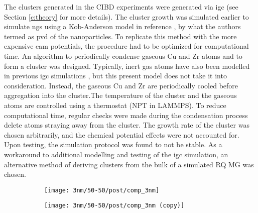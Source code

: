 The clusters generated in the CIBD experiments \cite{Benel2018,Benel2019} were generated via \gls{igc} (see Section \ref{c:theory} for more details). The cluster growth was simulated earlier to simulate \gls{ng}s using a Kob-Anderson model in reference \cite{Danilov2016}, by what the authors termed as \gls{pvd} of the nanoparticles. To replicate this method with the more expensive \gls{eam} potentials, the procedure had to be optimized for computational time. An algorithm to periodically condense gaseous Cu and Zr atoms and to form a cluster was designed. Typically, inert gas atoms have also been modelled in previous \gls{igc} simulations \cite{Krasnochtchekov2003,Krasnochtchekov2005}, but this present model does not take it into consideration. Instead, the gaseous Cu and Zr are periodically cooled before aggregation into the cluster.The temperature of the cluster and the gaseous atoms are controlled using a thermostat (NPT in LAMMPS).  To reduce computational time, regular checks were made during the condensation process delete atoms straying away from the cluster. The growth rate of the cluster was chosen arbitrarily, and the chemical potential effects were not accounted for. Upon testing, the simulation protocol was found to not be stable. As a workaround to additional modelling and testing of the \gls{igc} simulation, an alternative method of deriving clusters from the bulk of a simulated RQ MG was chosen. \par

\begin{figure}[t]
	\centering
	\begin{subfigure}{0.5\textwidth} 	\centering
		\texttt{[image: 3nm/50-50/post/comp\_3nm]} \caption{}
		\label{f:radial_3nm}
	\end{subfigure}%
	\begin{subfigure}{0.5\columnwidth} 	\centering
		\texttt{[image: 3nm/50-50/post/comp\_3nm (copy)]} \caption{}
		\label{f:radial_3nm_alt}
	\end{subfigure}%
	\label{f:clus_rad-3nm}
\end{figure}

